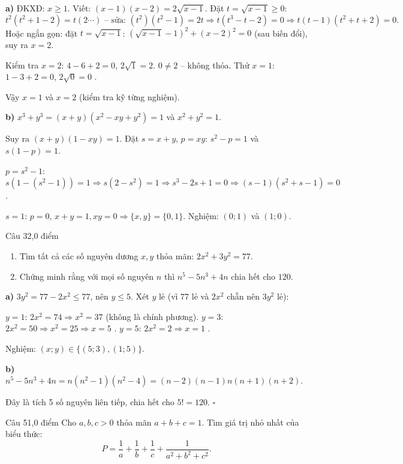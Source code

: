 \begin{loi_giai_cau}
\textbf{a)} ĐKXĐ: $x\ge1$. Viết: $(x-1)(x-2)=2\sqrt{x-1}$. Đặt $t=\sqrt{x-1}\ge0$:
\[t^2(t^2+1-2)=t(2\cdots)\text{ -- sửa: }(t^2)(t^2-1)=2t \Rightarrow t(t^3-t-2)=0 \Rightarrow t(t-1)(t^2+t+2)=0.\]
Hoặc ngắn gọn: đặt $t=\sqrt{x-1}$: $(\sqrt{x-1}-1)^2+(x-2)^2=0$ (sau biến đổi), suy ra $x=2$.

Kiểm tra $x=2$: $4-6+2=0$, $2\sqrt{1}=2$. $0\neq2$ -- không thỏa. Thử $x=1$: $1-3+2=0$, $2\sqrt{0}=0$ \checkmark .

Vậy $\boxed{x=1}$ và $\boxed{x=2}$ (kiểm tra kỹ từng nghiệm).

\textbf{b)} $x^3+y^3=(x+y)(x^2-xy+y^2)=1$ và $x^2+y^2=1$.

Suy ra $(x+y)(1-xy)=1$. Đặt $s=x+y$, $p=xy$: $s^2-p=1$ và $s(1-p)=1$.

$p=s^2-1$: $s(1-(s^2-1))=1\Rightarrow s(2-s^2)=1\Rightarrow s^3-2s+1=0\Rightarrow(s-1)(s^2+s-1)=0$.

$s=1$: $p=0$, $x+y=1,xy=0\Rightarrow\{x,y\}=\{0,1\}$. Nghiệm: $(0;1)$ và $(1;0)$.
\end{loi_giai_cau}

\begin{de_cau}{Câu 3}{2,0 điểm}
\begin{enumerate}[label=\alph*)]
  \item Tìm tất cả các số nguyên dương $x, y$ thỏa mãn: $2x^2 + 3y^2 = 77$.
  \item Chứng minh rằng với mọi số nguyên $n$ thì $n^5 - 5n^3 + 4n$ chia hết cho $120$.
\end{enumerate}
\end{de_cau}

\begin{loi_giai_cau}
\textbf{a)} $3y^2 = 77-2x^2 \le 77$, nên $y\le5$. Xét $y$ lẻ (vì $77$ lẻ và $2x^2$ chẵn nên $3y^2$ lẻ):

$y=1$: $2x^2=74\Rightarrow x^2=37$ (không là chính phương).
$y=3$: $2x^2=50\Rightarrow x^2=25\Rightarrow x=5$ \checkmark .
$y=5$: $2x^2=2\Rightarrow x=1$ \checkmark .

Nghiệm: $\boxed{(x;y)\in\{(5;3),(1;5)\}}$.

\textbf{b)} $n^5-5n^3+4n=n(n^2-1)(n^2-4)=(n-2)(n-1)n(n+1)(n+2)$.

Đây là tích 5 số nguyên liên tiếp, chia hết cho $5! = 120$. $\square$
\end{loi_giai_cau}

\begin{de_cau}{Câu 5}{1,0 điểm}
Cho $a, b, c > 0$ thỏa mãn $a + b + c = 1$. Tìm giá trị nhỏ nhất của biểu thức:
\[P = \dfrac{1}{a} + \dfrac{1}{b} + \dfrac{1}{c} + \dfrac{1}{a^2+b^2+c^2}.\]
\end{de_cau}

